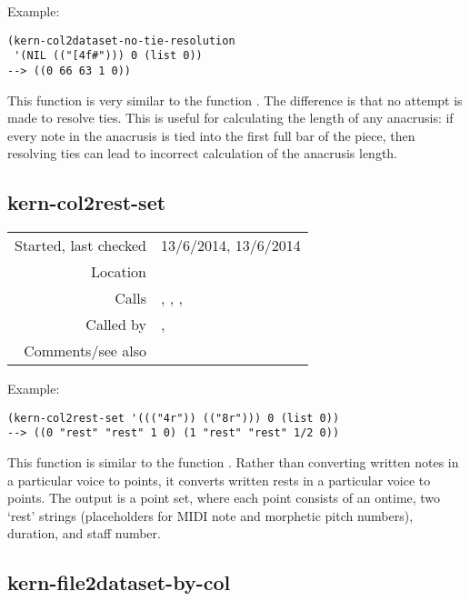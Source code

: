 \vspace{0.5cm}
\noindent Example:
\begin{verbatim}
(kern-col2dataset-no-tie-resolution
 '(NIL (("[4f#"))) 0 (list 0))
--> ((0 66 63 1 0))
\end{verbatim}

\noindent This function is very similar to the function
. The difference is that
no attempt is made to resolve ties. This is useful for
calculating the length of any anacrusis: if every note
in the anacrusis is tied into the first full bar of the
piece, then resolving ties can lead to incorrect
calculation of the anacrusis length.


\subsection*{kern-col2rest-set}\label{fun:kern-col2rest-set}

\vspace{0.3cm}
\begin{tabular}{r|p{8cm}}
Started, last checked & 13/6/2014, 13/6/2014 \\
Location & \nameref{sec:kern-by-col} \\
Calls & \nameref{fun:append-list}, \nameref{fun:constant-vector}, \nameref{fun:parse-kern-spaced-rests}, \nameref{fun:return-lists-of-length-n} \\
Called by & \nameref{fun:kern-anacrusis-correction},\newline \nameref{fun:kern-file2rest-set-by-col} \\
Comments/see also &
\end{tabular}

\vspace{0.5cm}
\noindent Example:
\begin{verbatim}
(kern-col2rest-set '((("4r")) (("8r"))) 0 (list 0))
--> ((0 "rest" "rest" 1 0) (1 "rest" "rest" 1/2 0))
\end{verbatim}

\noindent This function is similar to the function
. Rather than converting
written notes in a particular voice to points, it
converts written rests in a particular voice to
points. The output is a point set, where each point
consists of an ontime, two `rest' strings
(placeholders for MIDI note and morphetic
pitch numbers), duration, and staff number.


\subsection*{kern-file2dataset-by-col}\label{fun:kern-file2dataset-by-col}

